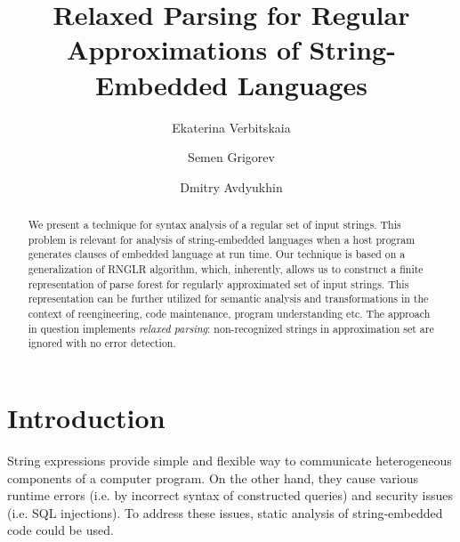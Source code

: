 \documentclass{llncs}
\begin{document}
\frontmatter          %

\pagestyle{headings}  %

\title{Relaxed Parsing for Regular Approximations of String-Embedded Languages}


\author{Ekaterina Verbitskaia \and Semen Grigorev
\and Dmitry Avdyukhin}
%
%


\maketitle              %

\begin{abstract}
We present a technique for syntax analysis of a regular set of input strings. 
This problem is relevant for analysis of string-embedded languages when a host 
program generates clauses of embedded language at run time. Our technique 
is based on a generalization of RNGLR algorithm, which, inherently, allows 
us to construct a finite representation of parse forest for regularly 
approximated set of input strings. This representation can be further 
utilized for semantic analysis and transformations in the context of 
reengineering, code maintenance, program understanding etc. The approach 
in question implements \emph{relaxed parsing}: non-recognized strings 
in approximation set are ignored with no error detection. 
\end{abstract}

\section{Introduction}
String expressions provide simple and flexible way to communicate heterogeneous 
components of a computer program. On the other hand, they cause various runtime 
errors (i.e. by incorrect syntax of constructed queries) and security issues 
(i.e. SQL injections). To address these issues, static analysis of string-embedded 
code could be used. 
\end{document}
